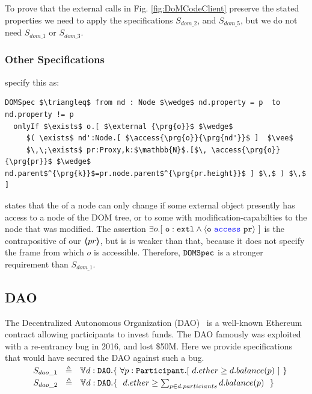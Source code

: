 To prove that the external calls in Fig. \ref{fig:DoMCodeClient} preserve the stated properties  we need to apply the specifications  $S_{dom\_2}$, 
 and $S_{dom\_5}$, but we do not need   $S_{dom\_1}$ or $S_{dom\_3}$.
 


\subsubsection{Other Specifications}

\citet{OOPSLA22} specify this as:
 
 \begin{lstlisting}[language = Chainmail, mathescape=true, frame=lines]
DOMSpec $\triangleq$ from nd : Node $\wedge$ nd.property = p  to nd.property != p
  onlyIf $\exists$ o.[ $\external {\prg{o}}$ $\wedge$ 
     $( \exists$ nd':Node.[ $\access{\prg{o}}{\prg{nd'}}$ ]  $\vee$ 
     $\,\;\exists$ pr:Proxy,k:$\mathbb{N}$.[$\, \access{\prg{o}}{\prg{pr}}$ $\wedge$ nd.parent$^{\prg{k}}$=pr.node.parent$^{\prg{pr.height}}$ ] $\,$ ) $\,$ ]
\end{lstlisting}

 states that the  of a node can only change if
some external object presently has 
access to a node of the DOM tree, or to some  with modification-capabilties
to the node that was modified.
The assertion $\exists {o}.[\ \mbox{\normalfont{\texttt{o}}}:\mbox{\normalfont{\texttt{extl}}} \wedge \langle \mbox{\normalfont{\texttt{o}}}\ {\color{blue}\texttt{access}}\ \mbox{\normalfont{\texttt{pr}}} \rangle\ ]$ is the contrapositive of our  $\langle\!\!\langle pr \rangle\!\!\rangle$, but is is weaker than that, because it does not specify the frame from which $o$ is accessible.
Therefore, $\mbox{\normalfont{\texttt{DOMSpec}}}$ is a stronger requirement than $S_{dom\_1}$.

 





\subsection{DAO}
The Decentralized Autonomous Organization (DAO)~\cite{Dao}  is a well-known Ethereum contract allowing 
participants to invest funds. The DAO famously was exploited with a re-entrancy bug in 2016, 
and lost \$50M. Here we provide specifications that would have secured the DAO against such a 
bug. 
\\ 
$\strut \SPSP  S_{dao\_1}\ \  \triangleq \ \ \TwoStatesN{ d:\prg{DAO}}{\ \forall p:\prg{Participant}. [\ d.ether \geq d.balance(p) \ ]   \ }$ 
\\
$\strut \SPSP  S_{dao\_2}\ \  \triangleq \ \ \TwoStatesN{ d:\prg{DAO}}{\ \ d.ether \geq \sum_{p \in d.particiants} d.balance(p)\  \ }$ 


